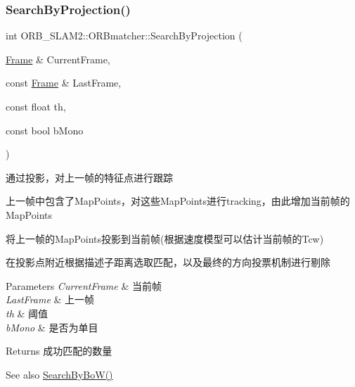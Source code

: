 \subsubsection{\texorpdfstring{Search\+By\+Projection()}{SearchByProjection()}\hspace{0.1cm}{\footnotesize\ttfamily [2/4]}}
{\footnotesize\ttfamily int O\+R\+B\+\_\+\+S\+L\+A\+M2\+::\+O\+R\+Bmatcher\+::\+Search\+By\+Projection (\begin{DoxyParamCaption}\item[{\mbox{\hyperlink{class_o_r_b___s_l_a_m2_1_1_frame}{Frame}} \&}]{Current\+Frame,  }\item[{const \mbox{\hyperlink{class_o_r_b___s_l_a_m2_1_1_frame}{Frame}} \&}]{Last\+Frame,  }\item[{const float}]{th,  }\item[{const bool}]{b\+Mono }\end{DoxyParamCaption})}



通过投影，对上一帧的特征点进行跟踪 

上一帧中包含了\+Map\+Points，对这些\+Map\+Points进行tracking，由此增加当前帧的\+Map\+Points ~\newline

\begin{DoxyEnumerate}
\item 将上一帧的\+Map\+Points投影到当前帧(根据速度模型可以估计当前帧的\+Tcw)
\item 在投影点附近根据描述子距离选取匹配，以及最终的方向投票机制进行剔除 
\begin{DoxyParams}{Parameters}
{\em Current\+Frame} & 当前帧 \\
\hline
{\em Last\+Frame} & 上一帧 \\
\hline
{\em th} & 阈值 \\
\hline
{\em b\+Mono} & 是否为单目 \\
\hline
\end{DoxyParams}
\begin{DoxyReturn}{Returns}
成功匹配的数量 
\end{DoxyReturn}
\begin{DoxySeeAlso}{See also}
\mbox{\hyperlink{class_o_r_b___s_l_a_m2_1_1_o_r_bmatcher_a024fe40fa89785df914ef0a59cdf605d}{Search\+By\+Bo\+W()}} 
\end{DoxySeeAlso}

\end{DoxyEnumerate}\mbox{\label{class_o_r_b___s_l_a_m2_1_1_o_r_bmatcher_af83a014848a63b5a3b3086386f7a865e}} 
